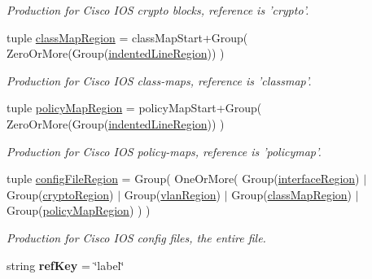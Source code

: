 \begin{DoxyCompactItemize}
\begin{DoxyCompactList}\small\item\em Production for Cisco I\-O\-S crypto blocks, reference is 'crypto'. \end{DoxyCompactList}\item 
\hypertarget{classxutools_1_1parsers_1_1_cisco_i_o_s_parser_a51bd4a694aa0ffb674688e5755e19dd4}{tuple \hyperlink{classxutools_1_1parsers_1_1_cisco_i_o_s_parser_a51bd4a694aa0ffb674688e5755e19dd4}{class\-Map\-Region} = class\-Map\-Start+Group( Zero\-Or\-More(Group(\hyperlink{classxutools_1_1parsers_1_1_cisco_i_o_s_parser_afd57a8ec6b65941a62ef834f94e4bdd0}{indented\-Line\-Region})) )}\label{classxutools_1_1parsers_1_1_cisco_i_o_s_parser_a51bd4a694aa0ffb674688e5755e19dd4}

\begin{DoxyCompactList}\small\item\em Production for Cisco I\-O\-S class-\/maps, reference is 'classmap'. \end{DoxyCompactList}\item 
\hypertarget{classxutools_1_1parsers_1_1_cisco_i_o_s_parser_a87ba65e78a4d64e3944da2bc7be377b0}{tuple \hyperlink{classxutools_1_1parsers_1_1_cisco_i_o_s_parser_a87ba65e78a4d64e3944da2bc7be377b0}{policy\-Map\-Region} = policy\-Map\-Start+Group( Zero\-Or\-More(Group(\hyperlink{classxutools_1_1parsers_1_1_cisco_i_o_s_parser_afd57a8ec6b65941a62ef834f94e4bdd0}{indented\-Line\-Region})) )}\label{classxutools_1_1parsers_1_1_cisco_i_o_s_parser_a87ba65e78a4d64e3944da2bc7be377b0}

\begin{DoxyCompactList}\small\item\em Production for Cisco I\-O\-S policy-\/maps, reference is 'policymap'. \end{DoxyCompactList}\item 
tuple \hyperlink{classxutools_1_1parsers_1_1_cisco_i_o_s_parser_a8c7dfc0e81b2f3828cb64c831977c569}{config\-File\-Region} = Group( One\-Or\-More( Group(\hyperlink{classxutools_1_1parsers_1_1_cisco_i_o_s_parser_a9e6d9c28d18016c8ec18503b707d0b3e}{interface\-Region}) $|$ Group(\hyperlink{classxutools_1_1parsers_1_1_cisco_i_o_s_parser_abba505010cea84487f03405b4ab06864}{crypto\-Region}) $|$ Group(\hyperlink{classxutools_1_1parsers_1_1_cisco_i_o_s_parser_a8ec65a187a6e9a9f9aa1474cebbba911}{vlan\-Region}) $|$ Group(\hyperlink{classxutools_1_1parsers_1_1_cisco_i_o_s_parser_a51bd4a694aa0ffb674688e5755e19dd4}{class\-Map\-Region}) $|$ Group(\hyperlink{classxutools_1_1parsers_1_1_cisco_i_o_s_parser_a87ba65e78a4d64e3944da2bc7be377b0}{policy\-Map\-Region}) ) )
\begin{DoxyCompactList}\small\item\em Production for Cisco I\-O\-S config files, the entire file. \end{DoxyCompactList}\item 
\hypertarget{classxutools_1_1parsers_1_1_cisco_i_o_s_parser_a1025c4a397e18ca768c1aa25283b2640}{string {\bfseries ref\-Key} = \char`\"{}label\char`\"{}}\label{classxutools_1_1parsers_1_1_cisco_i_o_s_parser_a1025c4a397e18ca768c1aa25283b2640}

\end{DoxyCompactItemize}


